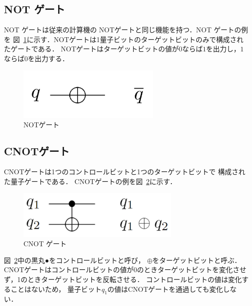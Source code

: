 \subsection{NOT ゲート}
NOT ゲートは従来の計算機の NOTゲートと同じ機能を持つ．NOT ゲートの例を
図~\ref{not_gate}に示す．NOTゲートは1量子ビットのターゲットビットのみで構成されたゲートである．
NOTゲートはターゲットビットの値が$0$ならば$1$を出力し，$1$ならば$0$を出力する．
\begin{figure}[tbp]
  \centering
  \includegraphics[width=7cm]{img/notgate.pdf}
  \caption{NOTゲート}
  \label{not_gate}
\end{figure}
\subsection{CNOTゲート}
CNOTゲートは1つのコントロールビットと1つのターゲットビットで
構成された量子ゲートである．
CNOTゲートの例を図~\ref{cnot_gate}に示す．
\begin{figure}[tbp]
  \centering
  \includegraphics[width=8cm]{img/cnotgate.pdf}
  \caption{CNOT ゲート}
  \label{cnot_gate}
\end{figure}
図~\ref{cnot_gate}中の黒丸●をコントロールビットと呼び，
$\oplus$をターゲットビットと呼ぶ．
CNOTゲートはコントロールビットの値が0のときターゲットビットを変化させず，1のときターゲットビットを反転させる．
コントロールビットの値は変化することはないため，
量子ビット$q_{1}$の値はCNOTゲートを通過しても変化しない．
